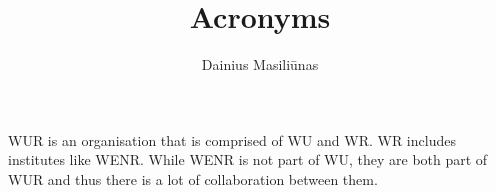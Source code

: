 \documentclass{article}
\title{Acronyms}
\author{Dainius Masili\=unas}
\begin{document}
\maketitle

\ac{WUR} is an organisation that is comprised of \ac{WU} and \ac{WR}. \ac{WR} includes institutes like \ac{WENR}. While \ac{WENR} is not part of \ac{WU}, they are both part of \ac{WUR} and thus there is a lot of collaboration between them.

\printnoidxglossary[type=acronym] 
\end{document}
